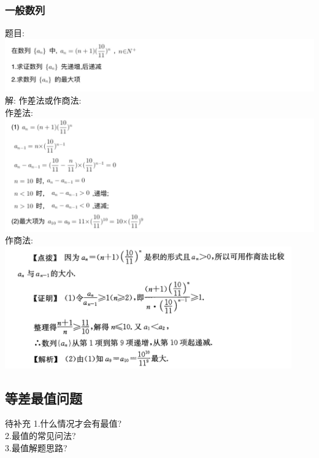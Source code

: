 \documentclass[hyperref, UTF8,11pt,a4paper]{ctexart} %
\begin{document}
\subsubsection{一般数列}
{\color{red}  题目: } \\
\includegraphics[width=500pt]  {pic/shulie/yibandandiaoxingtimu.jpg} \\
解: {\color{blue}  作差法或作商法: }\\
作差法: \\
\includegraphics[width=500pt]  {pic/shulie/yibandandiaoxingdaan1.jpg} \\
作商法: \\
\includegraphics[width=350pt]  {pic/shulie/yibandandiaoxingdaan2.jpg} \\


\subsection{等差最值问题}
待补充
1.什么情况才会有最值? \\
2.最值的常见问法? \\
3.最值解题思路? \\
\end{document}
